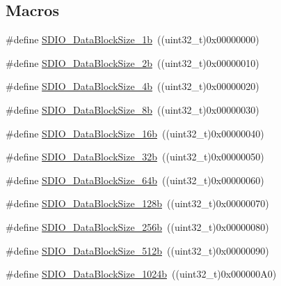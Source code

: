 \subsection*{Macros}
\begin{DoxyCompactItemize}
\item 
\#define \hyperlink{group___s_d_i_o___data___block___size_gaa86e90ddc3426b242a5230b3360c620d}{S\+D\+I\+O\+\_\+\+Data\+Block\+Size\+\_\+1b}~((uint32\+\_\+t)0x00000000)
\item 
\#define \hyperlink{group___s_d_i_o___data___block___size_ga7209d9d52635b66df85712c6fcd668ea}{S\+D\+I\+O\+\_\+\+Data\+Block\+Size\+\_\+2b}~((uint32\+\_\+t)0x00000010)
\item 
\#define \hyperlink{group___s_d_i_o___data___block___size_ga59cbaecfdebd63177d1208c268626f0a}{S\+D\+I\+O\+\_\+\+Data\+Block\+Size\+\_\+4b}~((uint32\+\_\+t)0x00000020)
\item 
\#define \hyperlink{group___s_d_i_o___data___block___size_ga14f91159c8c4faf49a335ed9b6a94d0b}{S\+D\+I\+O\+\_\+\+Data\+Block\+Size\+\_\+8b}~((uint32\+\_\+t)0x00000030)
\item 
\#define \hyperlink{group___s_d_i_o___data___block___size_ga52a7bdab9a75edd94d9c1152e8b078e2}{S\+D\+I\+O\+\_\+\+Data\+Block\+Size\+\_\+16b}~((uint32\+\_\+t)0x00000040)
\item 
\#define \hyperlink{group___s_d_i_o___data___block___size_gad0f89aa989c0cedf8d69eb28548413ca}{S\+D\+I\+O\+\_\+\+Data\+Block\+Size\+\_\+32b}~((uint32\+\_\+t)0x00000050)
\item 
\#define \hyperlink{group___s_d_i_o___data___block___size_ga981c219228ae8df11a501e15843338d4}{S\+D\+I\+O\+\_\+\+Data\+Block\+Size\+\_\+64b}~((uint32\+\_\+t)0x00000060)
\item 
\#define \hyperlink{group___s_d_i_o___data___block___size_gaba545c3a5e0f3296341d89a647cb9751}{S\+D\+I\+O\+\_\+\+Data\+Block\+Size\+\_\+128b}~((uint32\+\_\+t)0x00000070)
\item 
\#define \hyperlink{group___s_d_i_o___data___block___size_gaa099d7706f98a4fa6eb88277dc6680cf}{S\+D\+I\+O\+\_\+\+Data\+Block\+Size\+\_\+256b}~((uint32\+\_\+t)0x00000080)
\item 
\#define \hyperlink{group___s_d_i_o___data___block___size_gaa619848f7700962c5b7065f43e286e0b}{S\+D\+I\+O\+\_\+\+Data\+Block\+Size\+\_\+512b}~((uint32\+\_\+t)0x00000090)
\item 
\#define \hyperlink{group___s_d_i_o___data___block___size_ga7dad3c1c33e63a00eb6301b0a1135baf}{S\+D\+I\+O\+\_\+\+Data\+Block\+Size\+\_\+1024b}~((uint32\+\_\+t)0x000000\+A0)

\end{DoxyCompactItemize}

